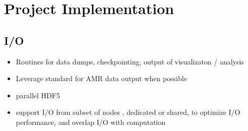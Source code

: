 \documentclass[14pt,letter]{article}
\begin{document}
\section{Project Implementation}

\subsection{I/O}

\begin{itemize}
\item Routines for data dumps, checkpointing, output of visualizaton /
  analysis
\item Leverage standard for AMR data output when possible
\item parallel HDF5
\item support I/O from subset of nodes , dedicated or shared, to
  optimize I/O performance, and overlap I/O with computation
\end{itemize}
\end{document}

